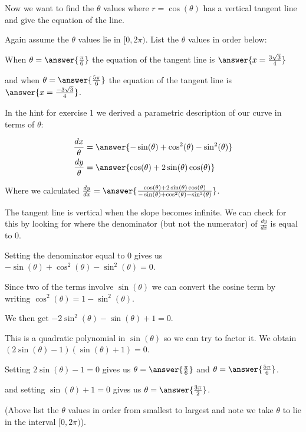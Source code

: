 \documentclass{ximera}
\begin{document}
\begin{exercise}
\begin{hint}
\end{hint}

\begin{exercise}



Now we want to find the $\theta$ values where $r=\cos(\theta)$ has a vertical tangent line and give the equation of the line. 

Again assume the $\theta$ values lie in $[0, 2\pi)$. List the $\theta$ values in order below: 

When $\theta=\answer{\frac{\pi}{6}}$ the equation of the tangent line is $\answer{x=\frac{3\sqrt{3}}{4} }$ 

and when $\theta=\answer{ \frac{5\pi}{6}}$ the equation of the tangent line is $\answer{x=\frac{-3\sqrt{3}}{4}}$. 





\begin{hint}


In the hint for exercise 1 we derived a parametric description of our curve in terms of $\theta$: 

\begin{align*}
\frac{dx}{\theta}&=\answer{  -\sin(\theta)+\cos^2(\theta)-\sin^2(\theta) } \\
\frac{dy}{\theta}&=\answer{ \cos(\theta) + 2\sin(\theta)\cos(\theta)    }
\end{align*} 

Where we calculated $\frac{dy}{dx}=\answer{ \frac{ \cos(\theta) + 2\sin(\theta)\cos(\theta) }{-\sin(\theta)+\cos^2(\theta)-\sin^2(\theta) }}$. 

The tangent line is vertical when the slope becomes infinite. We can check for this by looking for where the denominator (but not the numerator) of $\frac{dy}{dx}$ is equal to $0$.

Setting the denominator equal to $0$ gives us $ -\sin(\theta)+\cos^2(\theta)-\sin^2(\theta)=0$.  

Since two of the terms involve $\sin(\theta)$ we can convert the cosine term by writing $\cos^2(\theta)=1-\sin^2(\theta)$. 

We then get $-2\sin^2(\theta)-\sin(\theta)+1=0$. 

This is a quadratic polynomial in $\sin(\theta)$ so we can try to factor it. We obtain $(2\sin(\theta)-1)(\sin(\theta)+1)=0$. 


Setting $2\sin(\theta)-1=0$ gives us $\theta=\answer{ \frac{\pi}{6}}$ and $\theta=\answer{\frac{5\pi}{6}}$. 


and setting $\sin(\theta)+1=0$ gives us $\theta=\answer{ \frac{3\pi}{2}}$. 

(Above list the $\theta$ values in order from smallest to largest and note we take $\theta$ to lie in the interval $[0, 2\pi)$).


\end{hint}

\end{exercise}
\end{exercise}
\end{document}

